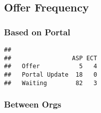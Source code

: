 \documentclass[
]{article}
\newenvironment{Shaded}{\begin{snugshade}}{\end{snugshade}}
\newcommand{\FunctionTok}[1]{\textcolor[rgb]{0.13,0.29,0.53}{\textbf{#1}}}
\newcommand{\NormalTok}[1]{#1}
\newcommand{\SpecialCharTok}[1]{\textcolor[rgb]{0.81,0.36,0.00}{\textbf{#1}}}
\begin{document}
\hypertarget{offer-frequency}{%
\subsection{Offer Frequency}\label{offer-frequency}}

\hypertarget{based-on-portal}{%
\subsubsection{Based on Portal}\label{based-on-portal}}

\begin{Shaded}
\end{Shaded}

\begin{verbatim}
##                
##                 ASP ECT
##   Offer           5   4
##   Portal Update  18   0
##   Waiting        82   3
\end{verbatim}

\hypertarget{between-orgs}{%
\subsubsection{Between Orgs}\label{between-orgs}}

\begin{Shaded}
\end{Shaded}
\end{document}
